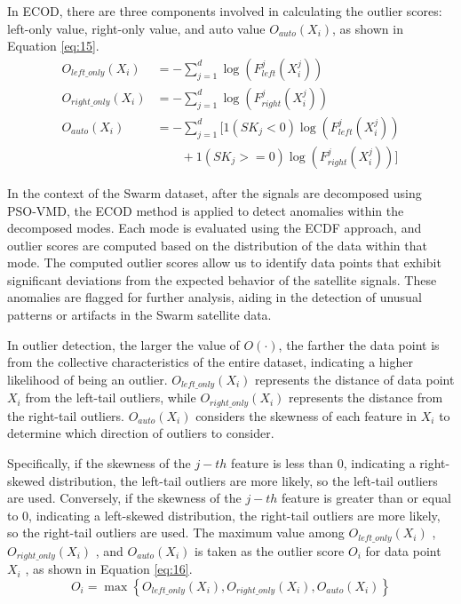 \documentclass[3p,authoryear,preprint,12pt]{elsarticle}
\begin{document}
In ECOD, there are three components involved in calculating the outlier scores: left-only value, right-only value, and auto value $O_{auto}(X_i)$, as shown in Equation \ref{eq:15}.
\begin{equation}
	\label{eq:15}
	\begin{split}
		O_{left\_only}(X_i) &= - \sum_{j=1}^{d} \log \left( F_{left}^j\left( X_i^j \right) \right) \\
		O_{right\_only}(X_i) &= - \sum_{j=1}^{d} \log \left( F_{right}^j \left( X_i^j \right) \right) \\
		O_{auto}(X_i) &= - \sum_{j=1}^{d} [ 1( SK_j < 0 )\log (F_{left}^j(X_i^j)) \\ & \quad \quad + 1( SK_j >= 0 ) \log (F_{right}^j(X_i^j))]  
	\end{split}
\end{equation}

{In the context of the Swarm dataset, after the signals are decomposed using PSO-VMD, the ECOD method is applied to detect anomalies within the decomposed modes. Each mode is evaluated using the ECDF approach, and outlier scores are computed based on the distribution of the data within that mode. The computed outlier scores allow us to identify data points that exhibit significant deviations from the expected behavior of the satellite signals. These anomalies are flagged for further analysis, aiding in the detection of unusual patterns or artifacts in the Swarm satellite data.}

In outlier detection, the larger the value of $O(\cdot)$, the farther the data point is from the collective characteristics of the entire dataset, indicating a higher likelihood of being an outlier. $O_{left\_only}(X_i)$ represents the distance of data point $X_i$  from the left-tail outliers, while $O_{right\_only}(X_i)$  represents the distance from the right-tail outliers. $O_{auto}(X_i)$ considers the skewness of each feature in $X_i$  to determine which direction of outliers to consider. 

Specifically, if the skewness of the  $j-th$ feature is less than 0, indicating a right-skewed distribution, the left-tail outliers are more likely, so the left-tail outliers are used. Conversely, if the skewness of the  $j-th$ feature is greater than or equal to 0, indicating a left-skewed distribution, the right-tail outliers are more likely, so the right-tail outliers are used. The maximum value among $O_{left\_only}(X_i)$ , $O_{right\_only}(X_i)$ , and $O_{auto}(X_i)$  is taken as the outlier score $O_i$  for data point $X_i$ , as shown in Equation \ref{eq:16}.
\begin{equation}
	\label{eq:16}
	O_i = \max \left\lbrace   O_{left\_only}(X_i), O_{right\_only}(X_i), O_{auto}(X_i)   \right\rbrace 
\end{equation}
\end{document}
